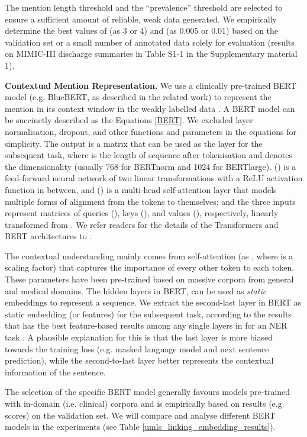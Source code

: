 \documentclass[twocolumn]{bmcart}
\begin{document}
The mention length threshold  and the ``prevalence'' threshold  are selected to ensure a sufficient amount of reliable, weak data generated. We empirically determine the best values of  (as 3 or 4) and  (as 0.005 or 0.01) based on the validation set or a small number of annotated data solely for evaluation (results on MIMIC-III discharge summaries in Table S1-1 in the Supplementary material 1).

\textbf{Contextual Mention Representation.} We use a clinically pre-trained BERT model (e.g. BlueBERT, as described in the related work) to represent the mention in its context window  in the weakly labelled data . A BERT model can be succinctly described as the Equations \ref{BERT}. We excluded layer normalisation, dropout, and other functions and parameters in the equations for simplicity. The output  is a matrix that can be used as the layer for the subsequent task, where  is the length of sequence after tokenisation and  denotes the dimensionality (usually 768 for BERTnorm and 1024 for BERTlarge). () is a feed-forward neural network of two linear transformations with a ReLU activation function in between, and () is a multi-head self-attention layer that models multiple forms of alignment from the tokens to themselves; and the three inputs represent matrices of queries (), keys (), and values (), respectively, linearly transformed from . We refer readers for the details of the Transformers and BERT architectures to \cite{vaswani2017attention,devlin-etal-2019-bert}.


The contextual understanding mainly comes from self-attention (as , where  is a scaling factor) that captures the importance of every other token to each token. These parameters have been pre-trained based on massive corpora from general and medical domains. The hidden layers in BERT,  can be used as \textit{static} embeddings to represent a sequence. We extract the second-last layer  in BERT as static embedding (or features) for the subsequent task, according to the results that  has the best feature-based results among any single layers in  for an NER task \cite{devlin-etal-2019-bert}. A plausible explanation for this is that the last layer is more biased towards the training loss (e.g. masked language model and next sentence prediction), while the second-to-last layer better represents the contextual information of the sentence.

The selection of the specific BERT model generally favours models pre-trained with in-domain (i.e. clinical) corpora \cite{gururangan2020} and is empirically based on results (e.g.  scores) on the validation set. We will compare and analyse different BERT models in the experiments (see Table \ref{umls_linking_embedding_results}).
\end{document}
